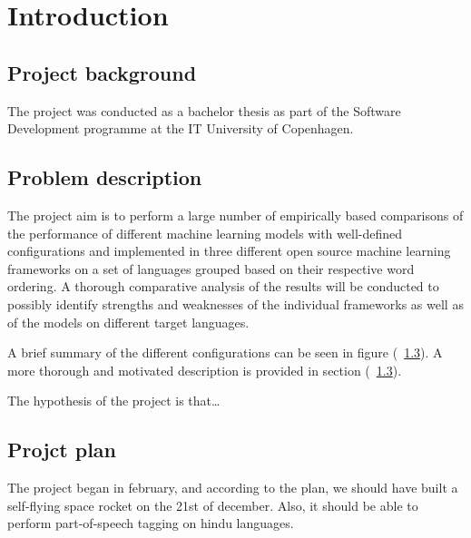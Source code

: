 
\section{Introduction}

\subsection{Project background}

The project was conducted as a bachelor thesis as part of the Software
Development programme at the IT University of Copenhagen. 


\subsection{Problem description}

The project aim is to perform a large number of empirically based comparisons of
the performance of different machine learning models with well-defined
configurations and implemented in three different open source machine learning
frameworks on a set of languages grouped based on their respective word
ordering. A thorough comparative analysis of the results will be conducted to
possibly identify strengths and weaknesses of the individual frameworks as well
as of the models on different target languages.

A brief summary of the different configurations can be seen in figure (~\ref{}). A
more thorough and motivated description is provided in section (~\ref{}).

The hypothesis of the project is that\ldots


\subsection{Projct plan}

The project began in february, and according to the plan, we should have built a
self-flying space rocket on the 21st of december. Also, it should be able to
perform part-of-speech tagging on hindu languages.

\pagebreak
